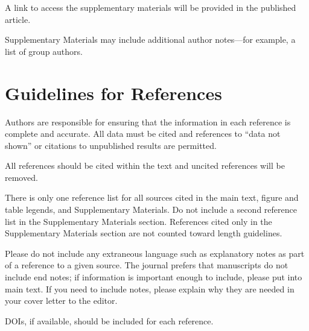 \documentclass{article}
\begin{document}
A link to access the supplementary materials will be provided in the published article.

Supplementary Materials may include additional author notes—for example, a list of group authors.

\section*{Guidelines for References}
Authors are responsible for ensuring that the information in each reference is complete and accurate. All data must be cited and references to ``data not shown'' or citations to unpublished results are permitted.

All references should be cited within the text and uncited references will be removed.

There is only one reference list for all sources cited in the main text, figure and table legends, and Supplementary Materials. Do not include a second reference list in the Supplementary Materials section. References cited only in the Supplementary Materials section are not counted toward length guidelines.

Please do not include any extraneous language such as explanatory notes as part of a reference to a given source. The journal prefers that manuscripts do not include end notes; if information is important enough to include, please put into main text.  If you need to include notes, please explain why they are needed in your cover letter to the editor.

DOIs, if available, should be included for each reference.

\printbibliography
\end{document}
